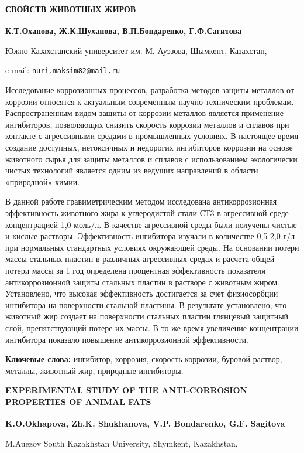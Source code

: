 {\bfseries СВОЙСТВ ЖИВОТНЫХ ЖИРОВ}

{\bfseries К.Т.Охапова\textsuperscript{\envelope }, Ж.К.Шуханова, В.П.Бондаренко,
Г.Ф.Сагитова}

Южно-Казахстанский университет им. М. Ауэзова, Шымкент, Казахстан,

e-mail:
\href{mailto:nuri.maksim82@mail.ru}{\nolinkurl{nuri.maksim82@mail.ru}}

Исследование коррозионных процессов, разработка методов защиты металлов
от коррозии относятся к актуальным современным научно-техническим
проблемам. Распространенным видом защиты от коррозии металлов является
применение ингибиторов, позволяющих снизить скорость коррозии металлов и
сплавов при контакте с агрессивными средами в промышленных условиях. В
настоящее время создание доступных, нетоксичных и недорогих ингибиторов
коррозии на основе животного сырья для защиты металлов и сплавов с
использованием экологически чистых технологий является одним из ведущих
направлений в области «природной» химии.

В данной работе гравиметрическим методом исследована антикоррозионная
эффективность животного жира к углеродистой стали СТ3 в агрессивной
среде концентрацией 1,0 моль/л. В качестве агрессивной среды были
получены чистые и кислые растворы. Эффективность ингибитора изучали в
количестве 0,5-2,0 г/л при нормальных стандартных условиях окружающей
среды. На основании потери массы стальных пластин в различных
агрессивных средах и расчета общей потери массы за 1 год определена
процентная эффективность показателя антикоррозионной защиты стальных
пластин в растворе с животным жиром. Установлено, что высокая
эффективность достигается за счет физиосорбции ингибитора на поверхности
стальной пластины. В результате установлено, что животный жир создает на
поверхности стальных пластин глянцевый защитный слой, препятствующий
потере их массы. В то же время увеличение концентрации ингибитора
показало повышение антикоррозионной эффективности.

{\bfseries Ключевые слова:} ингибитор, коррозия, скорость коррозии, буровой
раствор, металлы, животный жир, природные ингибиторы.

{\bfseries EXPERIMENTAL STUDY OF THE ANTI-CORROSION PROPERTIES OF ANIMAL
FATS}

{\bfseries K.O.Okhapova\textsuperscript{\envelope }, Zh.K. Shukhanova, V.P.
Bondarenko, G.F. Sagitova}

M.Auezov South Kazakhstan University, Shymkent, Kazakhstan,

